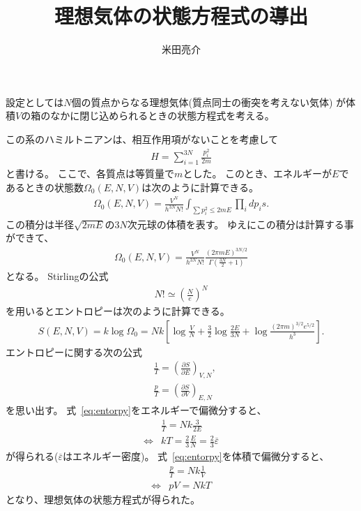 \documentclass{jsarticle}
\begin{document}
\title{理想気体の状態方程式の導出}
\author{米田亮介}
\maketitle	

設定としては$N$個の質点からなる理想気体(質点同士の衝突を考えない気体)
が体積$V$の箱のなかに閉じ込められるときの状態方程式を考える。

この系のハミルトニアンは、相互作用項がないことを考慮して
\begin{align}
H=\sum_{i=1}^{3N}\frac{p_{i}^{2}}{2m}
\end{align}
と書ける。
ここで、各質点は等質量で$m$とした。
このとき、エネルギーが$E$であるときの状態数$\Omega_{0}(E,N,V)$は次のように計算できる。
\begin{align}
\Omega_{0}(E,N,V)=\frac{V^{N}}{h^{3N}N!}\int_{\sum p_{i}^{2}\leq2mE}\prod_{i} dp_{i}s.
\end{align}
この積分は半径$\sqrt{2mE}$の$3N$次元球の体積を表す。
ゆえにこの積分は計算する事ができて、
\begin{align}
\Omega_{0}(E,N,V)=\frac{V^{N}}{h^{3N}N!}\frac{(2\pi mE)^{3N/2}}{\Gamma\left(\frac{3N}{2}+1\right)}
\end{align}
となる。
Stirlingの公式
\begin{align}
N!\simeq\left(\frac{N}{e}\right)^{N}
\end{align}
を用いるとエントロピーは次のように計算できる。
\begin{align}
S(E,N,V)=k\log\Omega_{0}=Nk\left[\log\frac{V}{N}+\frac{3}{2}\log\frac{2E}{3N}
+\log\frac{(2\pi m)^{3/2}e^{5/2}}{h^{3}}\right].
\label{eq:entorpy}
\end{align}
エントロピーに関する次の公式
\begin{align}
&\frac{1}{T}=\left(\frac{\partial S}{\partial E}\right)_{V,N},\\
&\frac{p}{T}=\left(\frac{\partial S}{\partial V}\right)_{E,N}
\end{align}
を思い出す。
式~\eqref{eq:entorpy}をエネルギーで偏微分すると、
\begin{align}
&\frac{1}{T}=Nk\frac{3}{2E}\\
\Longleftrightarrow&kT=\frac{2}{3}\frac{E}{N}=\frac{2}{3}\overline{\varepsilon}
\end{align}
が得られる($\overline{\varepsilon}$はエネルギー密度)。
式~\eqref{eq:entorpy}を体積で偏微分すると、
\begin{align}
&\frac{p}{T}=Nk\frac{1}{V}\\
\Longleftrightarrow&pV=NkT
\end{align}
となり、理想気体の状態方程式が得られた。
\end{document}
